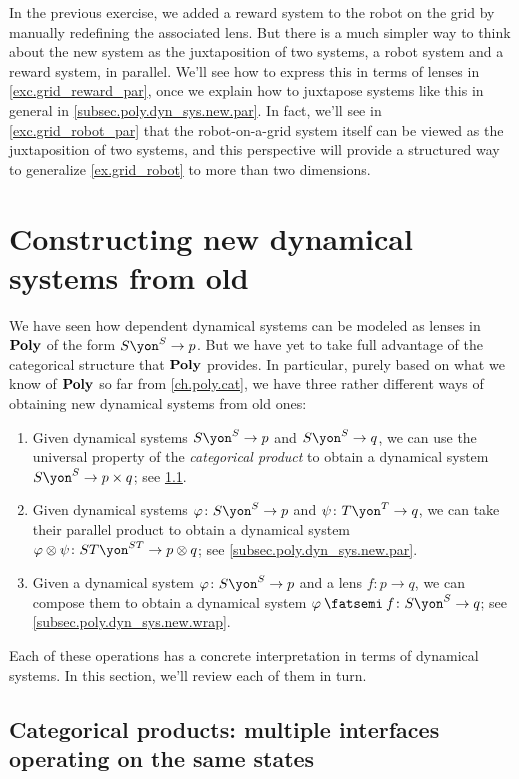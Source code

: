 \documentclass[Book-Poly]{subfiles}
\begin{document}
In the previous exercise, we added a reward system to the robot on the grid by manually redefining the associated lens.
But there is a much simpler way to think about the new system as the juxtaposition of two systems, a robot system and a reward system, in parallel.
We'll see how to express this in terms of lenses in \cref{exc.grid_reward_par}, once we explain how to juxtapose systems like this in general in \cref{subsec.poly.dyn_sys.new.par}.
In fact, we'll see in \cref{exc.grid_robot_par} that the robot-on-a-grid system itself can be viewed as the juxtaposition of two systems, and this perspective will provide a structured way to generalize \cref{ex.grid_robot} to more than two dimensions.


\section{Constructing new dynamical systems from old}\label{sec.poly.dyn_sys.new}

We have seen how dependent dynamical systems can be modeled as lenses in $\mathbf{Poly}$ of the form $S\yon^S\to p$.
But we have yet to take full advantage of the categorical structure that $\mathbf{Poly}$ provides.
In particular, purely based on what we know of $\mathbf{Poly}$ so far from \cref{ch.poly.cat}, we have three rather different ways of obtaining new dynamical systems from old ones:
\begin{enumerate}
    \item Given dynamical systems $S\yon^S\to p$ and $S\yon^S\to q$, we can use the universal property of the \emph{categorical product} to obtain a dynamical system $S\yon^S\to p\times q$; see \cref{subsec.poly.dyn_sys.new.prod}.
    \item Given dynamical systems $\varphi\colon S\yon^S\to p$ and $\psi\colon T\yon^T\to q$, we can take their parallel product to obtain a dynamical system $\varphi\otimes\psi\colon ST\yon^{ST}\to p\otimes q$; see \cref{subsec.poly.dyn_sys.new.par}.
    \item Given a dynamical system $\varphi\colon S\yon^S\to p$ and a lens $f\colon p\to q$, we can compose them to obtain a dynamical system $\varphi\then f\colon S\yon^S\to q$; see \cref{subsec.poly.dyn_sys.new.wrap}.
\end{enumerate}
Each of these operations has a concrete interpretation in terms of dynamical systems.
In this section, we'll review each of them in turn.

\subsection{Categorical products: multiple interfaces operating on the same states}\label{subsec.poly.dyn_sys.new.prod}
\end{document}
